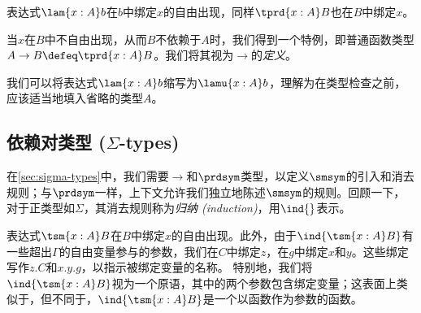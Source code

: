 表达式$\lam{x:A} b$在$b$中绑定$x$的自由出现，同样$\tprd{x:A} B$也在$B$中绑定$x$。

当$x$在$B$中不自由出现，从而$B$不依赖于$A$时，我们得到一个特例，即普通函数类型$A\to B \defeq \tprd{x:A} B$。我们将其视为$\to$的\emph{定义}。

我们可以将表达式$\lam{x:A} b$缩写为$\lamu{x:A} b$，理解为在类型检查之前，应该适当地填入省略的类型$A$。

\subsection{依赖对类型 (\texorpdfstring{$\Sigma$}{Σ}-types)}
\label{sec:more-formal-sigma}

%
%

在\cref{sec:sigma-types}中，我们需要$\to$和$\prdsym$类型，以定义$\smsym$的引入和消去规则；与$\prdsym$一样，上下文允许我们独立地陈述$\smsym$的规则。回顾一下，对于正类型如$\Sigma$，其消去规则称为\emph{归纳 (induction)}，用$\ind{}$表示。
%
%
表达式$\tsm{x:A} B$在$B$中绑定$x$的自由出现。此外，由于$\ind{\tsm{x:A} B}$有一些超出$\Gamma$的自由变量参与的参数，我们在$C$中绑定$z$，在$g$中绑定$x$和$y$。这些绑定写作$z.C$和$x.y.g$，以指示被绑定变量的名称。
%
特别地，我们将$\ind{\tsm{x:A} B}$视为一个原语，其中的两个参数包含绑定变量；这表面上类似于，但不同于，$\ind{\tsm{x:A} B}$是一个以函数作为参数的函数。

